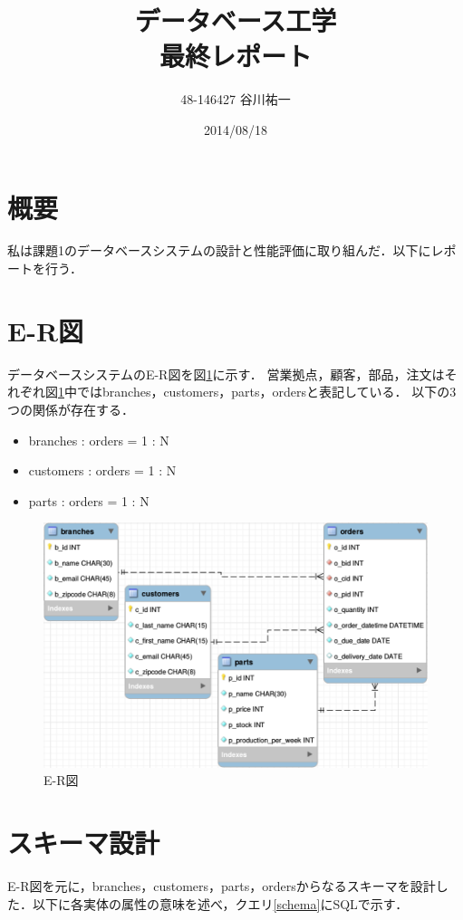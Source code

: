 \documentclass{jsarticle}
\title{データベース工学\\ 最終レポート}
\author{48-146427 谷川祐一}
\date{2014/08/18}
\begin{document}
\maketitle

\section{概要}
私は課題1のデータベースシステムの設計と性能評価に取り組んだ．以下にレポートを行う．

\section{E-R図}
データベースシステムのE-R図を図\ref{er-diagram}に示す．
営業拠点，顧客，部品，注文はそれぞれ図\ref{er-diagram}中ではbranches，customers，parts，ordersと表記している．
以下の3つの関係が存在する．
\begin{itemize}
  \item branches : orders = 1 : N
  \item customers : orders = 1 : N
  \item parts : orders = 1 : N
\end{itemize}

\begin{figure}[htbp]
  \begin{center}
    \includegraphics[width=\textwidth]{img_er_diagram.png}
  \end{center}
  \caption{E-R図}
  \label{er-diagram}
\end{figure}


\section{スキーマ設計}
E-R図を元に，branches，customers，parts，ordersからなるスキーマを設計した．以下に各実体の属性の意味を述べ，クエリ\ref{schema}にSQLで示す．
\end{document}
